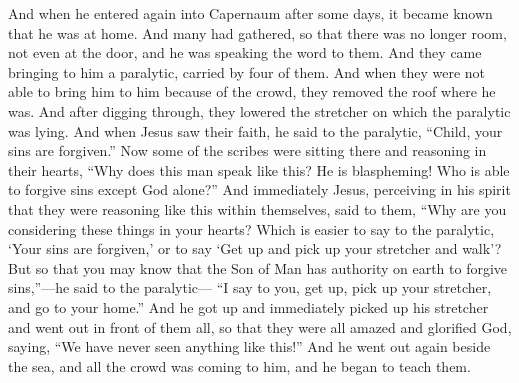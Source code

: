 \begin{biblechapter} %
 And when he entered again into Capernaum after some days, it became known that he was at home.
\verse And many had gathered, so that there was no longer room, not even at the door, and he was speaking the word to them.
\verse And they came bringing to him a paralytic, carried by four of them.
\verse And when they were not able to bring him to him because of the crowd, they removed the roof where he was. And after digging through, they lowered the stretcher on which the paralytic was lying.
\verse And when Jesus saw their faith, he said to the paralytic, “Child, your sins are forgiven.”
\verse Now some of the scribes were sitting there and reasoning in their hearts,
\verse “Why does this man speak like this? He is blaspheming! Who is able to forgive sins except God alone?”
\verse And immediately Jesus, perceiving in his spirit that they were reasoning like this within themselves, said to them, “Why are you considering these things in your hearts?
\verse Which is easier to say to the paralytic, ‘Your sins are forgiven,’ or to say ‘Get up and pick up your stretcher and walk’?
\verse But so that you may know that the Son of Man has authority on earth to forgive sins,”—he said to the paralytic—
\verse “I say to you, get up, pick up your stretcher, and go to your home.”
\verse And he got up and immediately picked up his stretcher and went out in front of them all, so that they were all amazed and glorified God, saying, “We have never seen anything like this!”
 And he went out again beside the sea, and all the crowd was coming to him, and he began to teach them.

\end{biblechapter}
